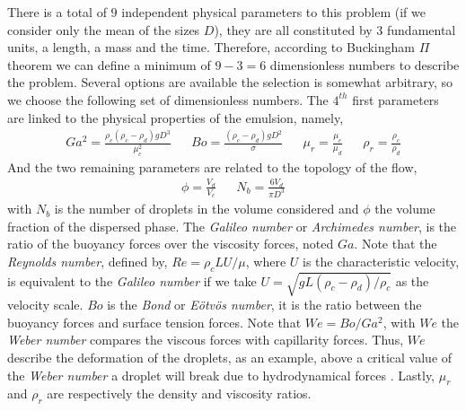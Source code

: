 There is a total of $9$ independent physical parameters to this problem (if we consider only the mean of the sizes $D$), they are all constituted by 3 fundamental units, a length, a mass and the time.
Therefore, according to Buckingham $\Pi$ theorem we can define a minimum of $9-3 = 6$ dimensionless numbers to describe the problem. 
Several options are available the selection is somewhat arbitrary, so we choose the following set of dimensionless numbers. 
The $4^{th}$ first parameters are linked to the physical properties of the emulsion, namely, 
\begin{align*}
    & Ga^2 =\frac{\rho_c(\rho_c - \rho_d) g D^3}{\mu^2_c}& 
    & Bo =\frac{(\rho_c - \rho_d) g D^2}{\sigma}&
    & \mu_r = \frac{\mu_c}{\mu_d}& 
    & \rho_r = \frac{\rho_c}{\rho_d}&
\end{align*}
And the two remaining parameters are related to the topology of the flow, 
\begin{align*}
    \phi = \frac{V_d}{V_c} & &
    N_b = \frac{6V_d}{\pi D^3}
\end{align*}
with $N_b$ is the number of droplets in the volume considered and $\phi$ the volume fraction of the dispersed phase.
The \textit{Galileo number} or \textit{Archimedes number}, is the ratio of the buoyancy forces over the viscosity forces, noted $Ga$.
Note that the \textit{Reynolds number}, defined by, $Re = \rho_c L U/\mu$, where $U$ is the characteristic velocity, is equivalent to the \textit{Galileo number} if we take $U = \sqrt{gL(\rho_c-\rho_d)/\rho_c}$ as the velocity scale.
$Bo$ is the \textit{Bond} or \textit{E\"otv\"os number}, it is the ratio between the buoyancy forces and surface tension forces. 
Note that $We = Bo/Ga^2$, with $We$ the \textit{Weber number} compares the viscous forces with capillarity forces.
Thus, $We$ describe the deformation of the droplets, as an example, above a critical value of the \textit{Weber number} a droplet will break due to hydrodynamical forces \citet{deike2022direct}. 
Lastly, $\mu_r$ and $\rho_r$ are respectively the density and viscosity ratios. 

